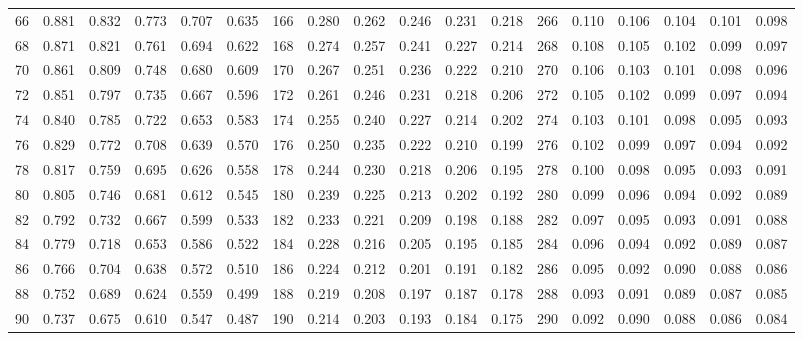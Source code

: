 \begin{table}[H]
\begin{tabular}{c|ccccc|c|ccccc|c|ccccc}
	    66      & 0.881 & 0.832 & 0.773 & 0.707 & 0.635 &     166     & 0.280 & 0.262 & 0.246 & 0.231 & 0.218 &     266     & 0.110 & 0.106 & 0.104 & 0.101 & 0.098 \\
	    68      & 0.871 & 0.821 & 0.761 & 0.694 & 0.622 &     168     & 0.274 & 0.257 & 0.241 & 0.227 & 0.214 &     268     & 0.108 & 0.105 & 0.102 & 0.099 & 0.097 \\
	    70      & 0.861 & 0.809 & 0.748 & 0.680 & 0.609 &     170     & 0.267 & 0.251 & 0.236 & 0.222 & 0.210 &     270     & 0.106 & 0.103 & 0.101 & 0.098 & 0.096 \\
	    72      & 0.851 & 0.797 & 0.735 & 0.667 & 0.596 &     172     & 0.261 & 0.246 & 0.231 & 0.218 & 0.206 &     272     & 0.105 & 0.102 & 0.099 & 0.097 & 0.094 \\
	    74      & 0.840 & 0.785 & 0.722 & 0.653 & 0.583 &     174     & 0.255 & 0.240 & 0.227 & 0.214 & 0.202 &     274     & 0.103 & 0.101 & 0.098 & 0.095 & 0.093 \\
	    76      & 0.829 & 0.772 & 0.708 & 0.639 & 0.570 &     176     & 0.250 & 0.235 & 0.222 & 0.210 & 0.199 &     276     & 0.102 & 0.099 & 0.097 & 0.094 & 0.092 \\
	    78      & 0.817 & 0.759 & 0.695 & 0.626 & 0.558 &     178     & 0.244 & 0.230 & 0.218 & 0.206 & 0.195 &     278     & 0.100 & 0.098 & 0.095 & 0.093 & 0.091 \\
	    80      & 0.805 & 0.746 & 0.681 & 0.612 & 0.545 &     180     & 0.239 & 0.225 & 0.213 & 0.202 & 0.192 &     280     & 0.099 & 0.096 & 0.094 & 0.092 & 0.089 \\
	    82      & 0.792 & 0.732 & 0.667 & 0.599 & 0.533 &     182     & 0.233 & 0.221 & 0.209 & 0.198 & 0.188 &     282     & 0.097 & 0.095 & 0.093 & 0.091 & 0.088 \\
	    84      & 0.779 & 0.718 & 0.653 & 0.586 & 0.522 &     184     & 0.228 & 0.216 & 0.205 & 0.195 & 0.185 &     284     & 0.096 & 0.094 & 0.092 & 0.089 & 0.087 \\
	    86      & 0.766 & 0.704 & 0.638 & 0.572 & 0.510 &     186     & 0.224 & 0.212 & 0.201 & 0.191 & 0.182 &     286     & 0.095 & 0.092 & 0.090 & 0.088 & 0.086 \\
	    88      & 0.752 & 0.689 & 0.624 & 0.559 & 0.499 &     188     & 0.219 & 0.208 & 0.197 & 0.187 & 0.178 &     288     & 0.093 & 0.091 & 0.089 & 0.087 & 0.085 \\
	    90      & 0.737 & 0.675 & 0.610 & 0.547 & 0.487 &     190     & 0.214 & 0.203 & 0.193 & 0.184 & 0.175 &     290     & 0.092 & 0.090 & 0.088 & 0.086 & 0.084 \\

\end{tabular}
\end{table}
